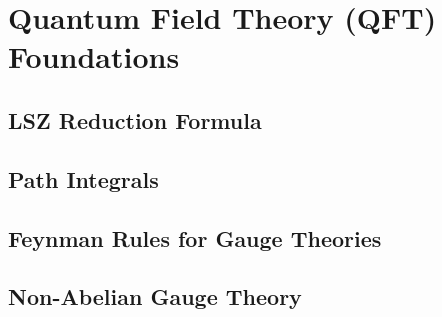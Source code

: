 
\chapter{Quantum Field Theory (QFT) Foundations}
\label{ch:qft-review}

\section{LSZ Reduction Formula}

\section{Path Integrals}

\section{Feynman Rules for Gauge Theories}

\section{Non-Abelian Gauge Theory}

